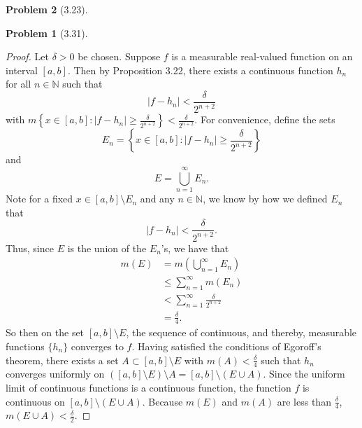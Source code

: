 \documentclass[12pt]{article}
\newcommand{\N}{\mathbb{N}}
\theoremstyle{definition}
\newtheorem{problem}{Problem}
\begin{document}
\begin{problem}[3.23]
\begin{problem}[3.31]
\begin{proof}
        Let \( \delta > 0 \) be chosen. Suppose \( f \) is a measurable real-valued function on an interval \( [a,b] \). Then by Proposition 3.22, there exists a continuous function \( h_n \) for all \( n \in \N \) such that 
            \[
                    |f - h_n| < \frac{\delta}{2^{n+2}}
            \]
        with \( \displaystyle m \left\{  x \in [a,b] : |f - h_n| \geq \frac{\delta}{2^{n+2}} \right\} < \frac{\delta}{2^{n+2}} \). For convenience, define the sets
            \[
                E_n =  \left\{  x \in [a,b] : |f - h_n| \geq \frac{\delta}{2^{n+2}} \right\}
            \]
        and 
            \[
                E = \bigcup_{n=1}^{\infty} E_n.    
            \]
        Note for a fixed \( x \in [a,b] \setminus E_n \) and any \( n \in \N \), we know by how we defined \( E_n \) that 
            \[
                 |f - h_n|  < \frac{\delta}{2^{n+2}}.
            \]
        Thus, since \( E \) is the union of the \( E_n \)'s, we have that
            \begin{align*}
                m(E) &= m\left( \bigcup_{n=1}^{\infty} E_n \right) \\
                     &\leq \sum_{n=1}^{\infty} m(E_n) \\
                     &< \sum_{n=1}^{\infty} \frac{\delta}{2^{n+2}} \\
                     &= \frac{\delta}{4}.
            \end{align*}
        So then on the set \( [a,b] \setminus E \), the sequence of continuous, and thereby, measurable functions \( \{ h_n\} \) converges to \( f \). Having satisfied the conditions of Egoroff's theorem, there exists a set \( A \subset [a,b] \setminus E \) with \( \displaystyle m(A) < \frac{\delta}{4} \) such that \( h_n \) converges uniformly on \( ([a,b] \setminus E) \setminus A = [a,b] \setminus (E \cup A )\). Since the uniform limit of continuous functions is a continuous function, the function \( f \) is continuous on \( [a,b] \setminus (E \cup A) \). Because \( \displaystyle m(E) \) and \( m(A) \) are less than \( \displaystyle \frac{\delta}{4} \), \(\displaystyle m(E \cup A) < \frac{\delta}{2} \).


\end{proof}
\end{problem}
\end{problem}
\end{document}
